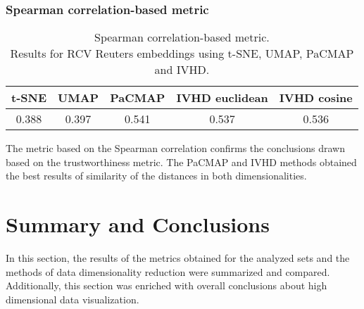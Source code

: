 \documentclass[12pt]{article}
\begin{document}
\subsubsection{Spearman correlation-based metric}
\begin{table}[h]
\centering
\caption{Spearman correlation-based metric. \\ Results for RCV Reuters embeddings using t-SNE, UMAP, PaCMAP and IVHD.}
\begin{tabular}{|c|c|l|l|l|}
\hline
\textbf{t-SNE} & \textbf{UMAP} & \textbf{PaCMAP}            & \textbf{IVHD euclidean}    & \textbf{IVHD cosine}       \\ \hline
0.388          & 0.397         & \multicolumn{1}{c|}{0.541} & \multicolumn{1}{c|}{0.537} & \multicolumn{1}{c|}{0.536} \\ \hline
\end{tabular}
\end{table}
The metric based on the Spearman correlation confirms the conclusions drawn based on the trustworthiness metric. The PaCMAP and IVHD methods obtained the best results of similarity of the distances in both dimensionalities.

\clearpage
\section{Summary and Conclusions}
In this section, the results of the metrics obtained for the analyzed sets and the methods of data dimensionality reduction were summarized and compared. Additionally, this section was enriched with overall conclusions about high dimensional data visualization.
\end{document}

